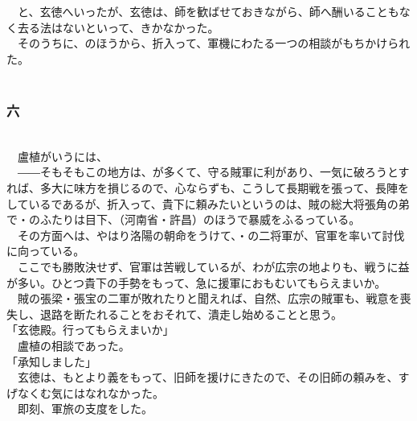 \documentclass[
  paper=a5,
  fontsize=10pt,
  jafontsize=9.5pt,
  tate,                  %
  open_bracket_pos=nibu, %
]{jlreq}
\begin{document}
　と、玄徳へいったが、玄徳は、師を歓ばせておきながら、師へ酬いることもなく去る法はないといって、きかなかった。\\


　そのうちに、のほうから、折入って、軍機にわたる一つの相談がもちかけられた。\\

\\

\subsubsection{六}

\\


　盧植がいうには、\\


　――そもそもこの地方は、が多くて、守る賊軍に利があり、一気に破ろうとすれば、多大に味方を損じるので、心ならずも、こうして長期戦を張って、長陣をしているであるが、折入って、貴下に頼みたいというのは、賊の総大将張角の弟で・のふたりは目下、（河南省・許昌）のほうで暴威をふるっている。\\


　その方面へは、やはり洛陽の朝命をうけて、・の二将軍が、官軍を率いて討伐に向っている。\\


　ここでも勝敗決せず、官軍は苦戦しているが、わが広宗の地よりも、戦うに益が多い。ひとつ貴下の手勢をもって、急に援軍におもむいてもらえまいか。\\


　賊の張梁・張宝の二軍が敗れたりと聞えれば、自然、広宗の賊軍も、戦意を喪失し、退路を断たれることをおそれて、潰走し始めることと思う。\\


「玄徳殿。行ってもらえまいか」\\


　盧植の相談であった。\\


「承知しました」\\


　玄徳は、もとより義をもって、旧師を援けにきたので、その旧師の頼みを、すげなくむ気にはなれなかった。\\


　即刻、軍旅の支度をした。\\
\end{document}
